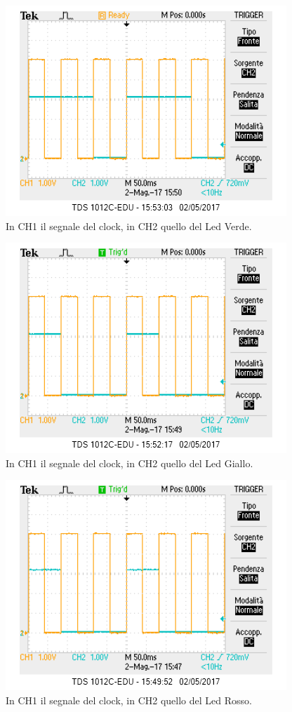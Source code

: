 \documentclass[10pt,a4paper]{article}
\begin{document}
\begin{figure}[!htb]
\centering
\includegraphics[scale=0.7]{clock-verde.png}
\caption{In CH1 il segnale del clock, in CH2 quello del Led Verde.\label{fig:verde}}
\end{figure}

\begin{figure}[!htb]
\centering
\includegraphics[scale=0.7]{clock-gialloverde.png}
\caption{In CH1 il segnale del clock, in CH2 quello del Led Giallo.\label{fig:giallo}}
\end{figure}

\begin{figure}[!htb]
\centering
\includegraphics[scale=0.7]{clock-rosso.png}
\caption{In CH1 il segnale del clock, in CH2 quello del Led Rosso.\label{fig:rosso}}
\end{figure}
\end{document}
